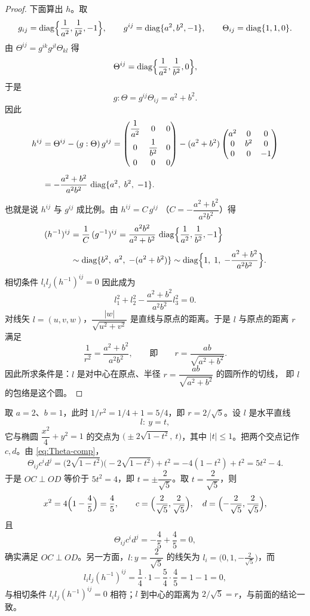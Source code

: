 \begin{proof}
下面算出 $h$。取
\[
g_{ij}=\operatorname{diag}\Bigl\{\frac{1}{a^2},\frac{1}{b^2},-1\Bigr\},\qquad
g^{ij}=\operatorname{diag}\{a^2,b^2,-1\},\qquad
\Theta_{ij}=\operatorname{diag}\{1,1,0\}.
\]
由 $\Theta^{ij}=g^{ik}g^{jl}\Theta_{kl}$ 得
\[
\Theta^{ij}=\operatorname{diag}\Bigl\{\frac{1}{a^2},\frac{1}{b^2},0\Bigr\},
\]
于是
\[
g:\Theta=g^{ij}\Theta_{ij}=a^2+b^2 .
\]
因此
\begin{align*}
h^{ij}&=\Theta^{ij}-(g:\Theta)\,g^{ij}
=
\begin{pmatrix}
\dfrac{1}{a^2} & 0 & 0\\[6pt]
0 & \dfrac{1}{b^2} & 0\\[6pt]
0 & 0 & 0
\end{pmatrix}
-(a^2+b^2)
\begin{pmatrix}
a^2 & 0 & 0\\
0 & b^2 & 0\\
0 & 0 & -1
\end{pmatrix}\\[4pt]
&=-\frac{a^2+b^2}{a^2b^2}\,
\operatorname{diag}\{a^2,\;b^2,\;-1\}.
\end{align*}
也就是说 $h^{ij}$ 与 $g^{ij}$ 成比例。由 $h^{ij}=C\,g^{ij}$
（$C=-\dfrac{a^2+b^2}{a^2b^2}$）得
\begin{align*}
(h^{-1})^{ij}&=\frac1C\,(g^{-1})^{ij}
=\frac{a^2b^2}{a^2+b^2}\,
\operatorname{diag}\Bigl\{\frac{1}{a^2},\frac{1}{b^2},-1\Bigr\}\\[4pt]
&\sim\operatorname{diag}\{b^2,\;a^2,\;-(a^2+b^2)\}
\sim\operatorname{diag}\Bigl\{1,\;1,\;-\frac{a^2+b^2}{a^2b^2}\Bigr\}.
\end{align*}
相切条件 $l_il_j(h^{-1})^{ij}=0$ 因此成为
\[
l_1^2+l_2^2-\frac{a^2+b^2}{a^2b^2}l_3^2=0 .
\]
对线矢 $l=(u,v,w)$，$\dfrac{|w|}{\sqrt{u^2+v^2}}$ 是直线与原点的距离。于是 $l$ 与原点的距离
$r$ 满足
\[
\frac{1}{r^2}=\frac{a^2+b^2}{a^2b^2},
\qquad\text{即}\qquad
r=\frac{ab}{\sqrt{a^2+b^2}} .
\]
因此所求条件是：$l$ 是对中心在原点、半径 $r=\dfrac{ab}{\sqrt{a^2+b^2}}$ 的圆所作的切线，
即 $l$ 的包络是这个圆。
\end{proof}

\begin{example}[数值验证]
取 $a=2$、$b=1$，此时 $1/r^2=1/4+1=5/4$，即 $r=2/\sqrt5$。设 $l$ 是水平直线
\[
l:\ y=t,
\]
它与椭圆 $\dfrac{x^2}{4}+y^2=1$ 的交点为 $\bigl(\pm 2\sqrt{1-t^2},\ t\bigr)$，其中
$|t|\le 1$。把两个交点记作 $c,d$。由 \eqref{eq:Theta-comp}，
\[
\Theta_{ij}c^id^j
=\bigl(2\sqrt{1-t^2}\bigr)\bigl(-2\sqrt{1-t^2}\bigr)+t^2
=-4(1-t^2)+t^2=5t^2-4 .
\]
于是 $OC\perp OD$ 等价于 $5t^2=4$，即 $t=\pm\dfrac{2}{\sqrt5}$。取 $t=\dfrac{2}{\sqrt5}$，则
\[
x^2=4\Bigl(1-\frac45\Bigr)=\frac45,
\qquad
c=\Bigl(\frac{2}{\sqrt5},\frac{2}{\sqrt5}\Bigr),\quad
d=\Bigl(-\frac{2}{\sqrt5},\frac{2}{\sqrt5}\Bigr),
\]
且
\[
\Theta_{ij}c^id^j
=-\frac45+\frac45=0,
\]
确实满足 $OC\perp OD$。另一方面，$l:y=\dfrac{2}{\sqrt5}$ 的线矢为
$l_i=\bigl(0,1,-\tfrac{2}{\sqrt5}\bigr)$，而
\[
l_il_j(h^{-1})^{ij}
=\frac14\cdot 1-\frac54\cdot\frac45=1-1=0,
\]
与相切条件 $l_il_j(h^{-1})^{ij}=0$ 相符；$l$ 到中心的距离为 $2/\sqrt5=r$，与前面的结论一致。
\end{example}

